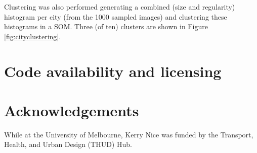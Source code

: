 \documentclass[final,3p,times,authoryear]{elsarticle}
\begin{document}
%

Clustering was also performed generating a combined (size and regularity) histogram per city (from the 1000 sampled images) and clustering these histograms in a SOM. Three (of ten) clusters are shown in Figure \ref{fig:cityclustering}.




\section{Code availability and licensing}\label{sec:available}





\section*{Acknowledgements}
While at the University of Melbourne, Kerry Nice was funded by the Transport, Health, and Urban Design (THUD) Hub. 
 
\end{document}
